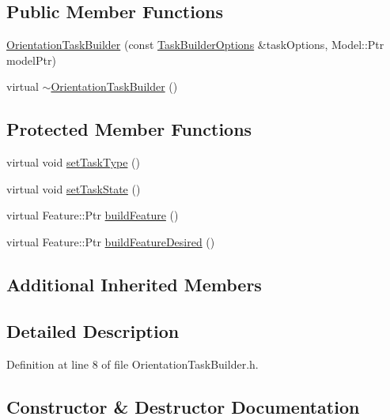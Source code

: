 \subsection*{Public Member Functions}
\begin{DoxyCompactItemize}
\item 
\hyperlink{classocra_1_1OrientationTaskBuilder_ae21c16c5b7c2f47aaff15a33cc49a337}{Orientation\+Task\+Builder} (const \hyperlink{classocra_1_1TaskBuilderOptions}{Task\+Builder\+Options} \&task\+Options, Model\+::\+Ptr model\+Ptr)
\item 
virtual \hyperlink{classocra_1_1OrientationTaskBuilder_a15053032636ee9416465134314a18226}{$\sim$\+Orientation\+Task\+Builder} ()
\end{DoxyCompactItemize}
\subsection*{Protected Member Functions}
\begin{DoxyCompactItemize}
\item 
virtual void \hyperlink{classocra_1_1OrientationTaskBuilder_a491f3d3db66afb5b5e3230983b4b15c9}{set\+Task\+Type} ()
\item 
virtual void \hyperlink{classocra_1_1OrientationTaskBuilder_ab30b211f4aa00ed4c78daae36aca6c42}{set\+Task\+State} ()
\item 
virtual Feature\+::\+Ptr \hyperlink{classocra_1_1OrientationTaskBuilder_a38d5badfcdbcdbc745f305e38af8b737}{build\+Feature} ()
\item 
virtual Feature\+::\+Ptr \hyperlink{classocra_1_1OrientationTaskBuilder_af5f11bdd9c43cb52e29054c6b293d533}{build\+Feature\+Desired} ()
\end{DoxyCompactItemize}
\subsection*{Additional Inherited Members}


\subsection{Detailed Description}


Definition at line 8 of file Orientation\+Task\+Builder.\+h.



\subsection{Constructor \& Destructor Documentation}
